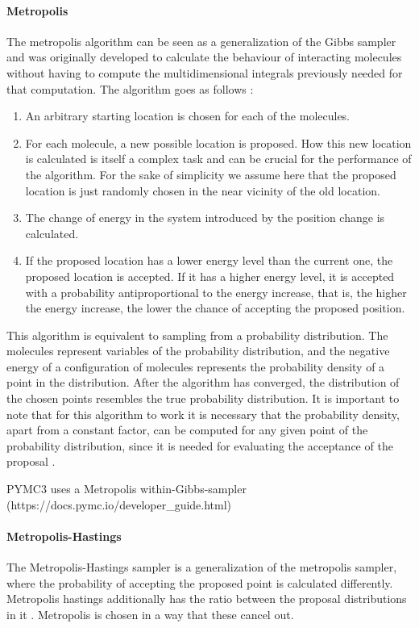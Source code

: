\documentclass{article}
\begin{document}
\paragraph{Metropolis}
The metropolis algorithm can be seen as a generalization of the Gibbs sampler \cite{1439840954} and was originally developed to calculate the behaviour of interacting molecules without having to compute the multidimensional integrals previously needed for that computation\cite{Metropolis1953}. The algorithm goes as follows : 
\begin{enumerate}
	\item An arbitrary starting location is chosen for each of the molecules. 
	\item For each molecule, a new possible location is proposed. How this new location is calculated is itself a complex task and can be crucial for the performance of the algorithm. For the sake of simplicity we assume here that the proposed location is just randomly chosen in the near vicinity of the old location.
	\item The change of energy in the system introduced by the position change is calculated.
	\item If the proposed location has a lower energy level than the current one, the proposed location is accepted. If it has a higher energy level, it is accepted with
	a probability antiproportional to the energy increase, that is, the higher the energy increase, the lower the chance of accepting the proposed position. 
\end{enumerate}
This algorithm is equivalent to sampling from a probability distribution. The molecules represent variables of the probability distribution, and the negative energy of a configuration of molecules represents the probability density of a point in the distribution. After the algorithm has converged, the distribution of the chosen points resembles the true probability distribution. It is important to note that for this algorithm to work it is necessary that the probability density, apart from a constant factor, can be computed for any given point of the probability distribution, since it is needed for evaluating the acceptance of the proposal \cite{1439840954}.

PYMC3 uses a Metropolis within-Gibbs-sampler (https://docs.pymc.io/developer\_guide.html)
\paragraph{Metropolis-Hastings}
The Metropolis-Hastings sampler is a generalization of the metropolis sampler, where the probability of accepting the proposed point is calculated differently.
Metropolis hastings additionally has the ratio between the proposal distributions in it \cite{chib1995understanding}. Metropolis is chosen in a way that these cancel out.
\end{document}
